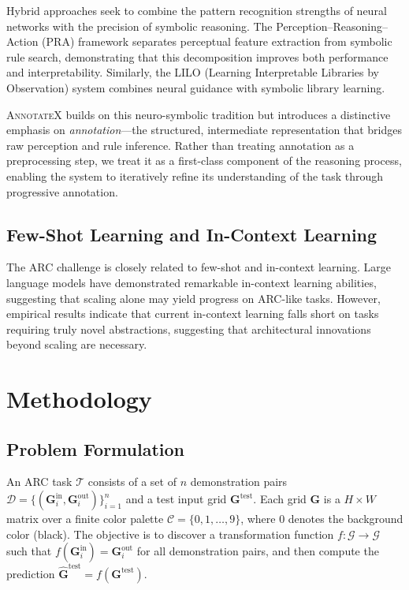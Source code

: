 \documentclass[conference,10pt,letterpaper]{IEEEtran}
\newcommand{\annotatexname}{\textsc{AnnotateX}}
\begin{document}
Hybrid approaches seek to combine the pattern recognition strengths of neural networks with the precision of symbolic reasoning. The Perception--Reasoning--Action (PRA) framework \cite{yuan2024neuro} separates perceptual feature extraction from symbolic rule search, demonstrating that this decomposition improves both performance and interpretability. Similarly, the LILO (Learning Interpretable Libraries by Observation) system \cite{valmeekam2023lilo} combines neural guidance with symbolic library learning.

\annotatexname{} builds on this neuro-symbolic tradition but introduces a distinctive emphasis on \emph{annotation}---the structured, intermediate representation that bridges raw perception and rule inference. Rather than treating annotation as a preprocessing step, we treat it as a first-class component of the reasoning process, enabling the system to iteratively refine its understanding of the task through progressive annotation.

\subsection{Few-Shot Learning and In-Context Learning}

The ARC challenge is closely related to few-shot and in-context learning. Large language models \cite{brown2020language} have demonstrated remarkable in-context learning abilities, suggesting that scaling alone may yield progress on ARC-like tasks. However, empirical results \cite{mitchell2021abstraction} indicate that current in-context learning falls short on tasks requiring truly novel abstractions, suggesting that architectural innovations beyond scaling are necessary.

\section{Methodology}
\label{sec:methodology}

\subsection{Problem Formulation}

An ARC task $\mathcal{T}$ consists of a set of $n$ demonstration pairs $\mathcal{D} = \{(\mathbf{G}_i^{\text{in}}, \mathbf{G}_i^{\text{out}})\}_{i=1}^{n}$ and a test input grid $\mathbf{G}^{\text{test}}$. Each grid $\mathbf{G}$ is a $H \times W$ matrix over a finite color palette $\mathcal{C} = \{0, 1, \ldots, 9\}$, where $0$ denotes the background color (black). The objective is to discover a transformation function $f: \mathcal{G} \to \mathcal{G}$ such that $f(\mathbf{G}_i^{\text{in}}) = \mathbf{G}_i^{\text{out}}$ for all demonstration pairs, and then compute the prediction $\hat{\mathbf{G}}^{\text{test}} = f(\mathbf{G}^{\text{test}})$.
\end{document}
